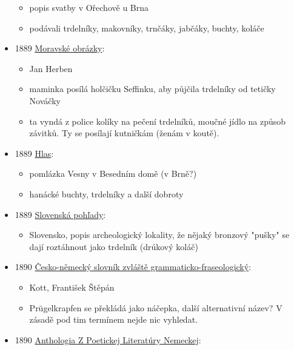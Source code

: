 \begin{itemize}
  \begin{itemize}
  \tightlist
  \item
    popis svatby v Ořechově u Brna
  \item
    podávali trdelníky, makovníky, trnčáky, jabčáky, buchty, koláče
  \end{itemize}
\item
  1889
  \href{https://ndk.cz/view/uuid:df0f4040-895f-11dd-a7d7-000d606f5dc6?page=uuid\%3A1bb49280-82c0-11e7-94b3-005056825209&fulltext=trdeln\%C3\%ADky}{Moravské
  obrázky}:

  \begin{itemize}
  \tightlist
  \item
    Jan Herben
  \item
    maminka posílá holčičku Seffinku, aby půjčila trdelníky od tetičky
    Nováčky
  \item
    ta vyndá z police kolíky na pečení trdelníků, moučné jídlo na způsob
    závitků. Ty se posílají kutničkám (ženám v koutě).
  \end{itemize}
\item
  1889
  \href{https://www.digitalniknihovna.cz/vkol/uuid/uuid:3a12df2c-c1ab-42a4-a423-5746952a0111}{Hlas}:

  \begin{itemize}
  \tightlist
  \item
    pomlázka Vesny v Besedním domě (v Brně?)
  \item
    hanácké buchty, trdelníky a další dobroty
  \end{itemize}
\item
  1889
  \href{https://dikda.snk.sk/view/uuid:1ecf9029-7613-401d-843c-e2938a484970?page=uuid:43b26cf7-af4a-4231-8901-ba41c009c9e7&fulltext=trdeln\%C3\%ADk\%20OR\%20trdeln\%C3\%ADka\%20OR\%20trdeln\%C3\%ADku}{Slovenská
  pohľady}:

  \begin{itemize}
  \tightlist
  \item
    Slovensko, popis archeologický lokality, že nějaký bronzový "pušky"
    se dají roztáhnout jako trdelník (drúkový koláč)
  \end{itemize}
\item
  1890
  \href{https://ndk.cz/view/uuid:18b40310-07ad-11dd-8ccf-000d606f5dc6?page=uuid\%3Aae6c9544-ef09-495a-bf20-9e525fdb15b2&fulltext=Pr\%C3\%BCgelkrapfen}{Česko-německý
  slovník zvláště grammaticko-fraseologický}:

  \begin{itemize}
  \tightlist
  \item
    Kott, František Štěpán
  \item
    Prügelkrapfen se překládá jako náčepka, další alternativní název? V
    zásadě pod tim termínem nejde nic vyhledat.
  \end{itemize}
\item
  1890
  \href{https://dikda.snk.sk/uuid/uuid:f747b566-df1c-4c50-a3a8-7817d299de0e}{Anthologia
  Z Poetickej Literatúry Nemeckej}:


\end{itemize}
